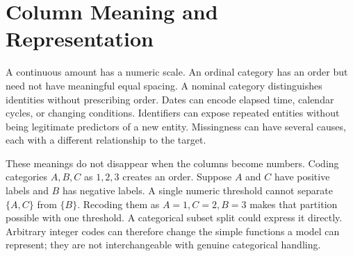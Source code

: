 \section{Column Meaning and Representation}
\label{sec:tabular-modality}

A continuous amount has a numeric scale. An ordinal category has an order but need not have meaningful equal spacing. A nominal category distinguishes identities without prescribing order. Dates can encode elapsed time, calendar cycles, or changing conditions. Identifiers can expose repeated entities without being legitimate predictors of a new entity. Missingness can have several causes, each with a different relationship to the target.

These meanings do not disappear when the columns become numbers. Coding categories $A,B,C$ as $1,2,3$ creates an order. Suppose $A$ and $C$ have positive labels and $B$ has negative labels. A single numeric threshold cannot separate $\{A,C\}$ from $\{B\}$. Recoding them as $A=1,C=2,B=3$ makes that partition possible with one threshold. A categorical subset split could express it directly. Arbitrary integer codes can therefore change the simple functions a model can represent; they are not interchangeable with genuine categorical handling.

\begin{center}
\begin{minipage}{\linewidth}
\centering
{}
\label{fig:tabular-representation}
\end{minipage}
\end{center}

